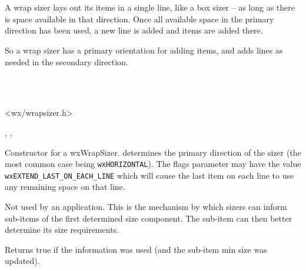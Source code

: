 \section{}\label{wxwrapsizer}

A wrap sizer lays out its items in a single line, like a box sizer -- as long 
as there is space available in that direction. Once all available space in 
the primary direction has been used, a new line is added and items are added
there.

So a wrap sizer has a primary orientation for adding items, and adds lines
as needed in the secondary direction. 


\\
\\


<wx/wrapsizer.h>




, , 




\label{wxwrapsizerwxwrapsizer}


Constructor for a wxWrapSizer.  determines the primary direction of
the sizer (the most common case being \texttt{wxHORIZONTAL}). The flags
parameter may have the value \texttt{wxEXTEND\_LAST\_ON\_EACH\_LINE} which will
cause the last item on each line to use any remaining space on that line.


\label{wxwrapsizerinformfirstdirection}


Not used by an application. This is the mechanism by which sizers can inform 
sub-items of the first determined size component. The sub-item can then better
determine its size requirements. 

Returns true if the information was used (and the sub-item min size was updated).



